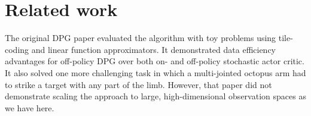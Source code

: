 \documentclass{article} %
\begin{document}
\section{Related work}






The original DPG paper evaluated the algorithm with toy problems using
tile-coding and linear function approximators.  It demonstrated data
efficiency advantages for off-policy DPG over both on- and off-policy
stochastic actor critic.  It also solved one more challenging task in
which a multi-jointed octopus arm had to strike a target with any part
of the limb. However, that paper did not demonstrate scaling the
approach to large, high-dimensional observation spaces as we have
here.
\end{document}
